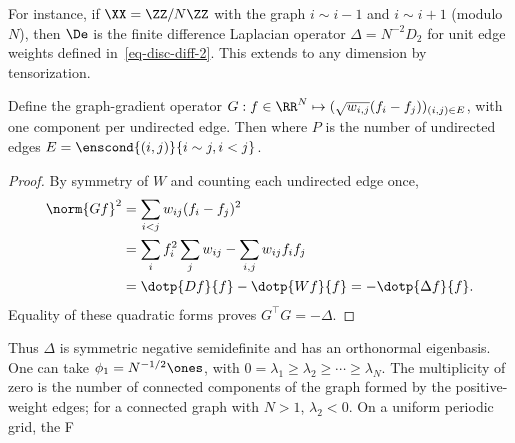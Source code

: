 For instance, if $\XX = \ZZ/N\ZZ$ with the graph $i \sim i-1$ and $i \sim i+1$ (modulo $N$), then $\De$ is the finite difference Laplacian operator $\Delta=N^{-2}D_2$ for unit edge weights defined in~\eqref{eq-disc-diff-2}. This extends to any dimension by tensorization.

\begin{prop}
Define the graph-gradient operator $G : f \in \RR^N \mapsto ( \sqrt{w_{i,j}} (f_i-f_j) )_{(i,j)\in E}$, with one component per undirected edge. Then
where $P$ is the number of undirected edges $E=\enscond{(i,j)}{i \sim j, i<j}$.
\end{prop}
\begin{proof}
By symmetry of $W$ and counting each undirected edge once,
\begin{align*}
 \norm{Gf}^2
 &=\sum_{i<j}w_{ij}(f_i-f_j)^2\\
 &=\sum_i f_i^2\sum_jw_{ij}-\sum_{i,j}w_{ij}f_if_j\\
 &=\dotp{Df}{f}-\dotp{Wf}{f}=-\dotp{\Delta f}{f}.
\end{align*}
Equality of these quadratic forms proves $G^\top G=-\Delta$.
\end{proof}

Thus $\Delta$ is symmetric negative semidefinite and has an orthonormal eigenbasis. One can take $\phi_1=N^{-1/2}\ones$, with $0=\lambda_1\geq\lambda_2\geq\cdots\geq\lambda_N$. The multiplicity of zero is the number of connected components of the graph formed by the positive-weight edges; for a connected graph with $N>1$, $\lambda_2<0$. On a uniform periodic grid, the F